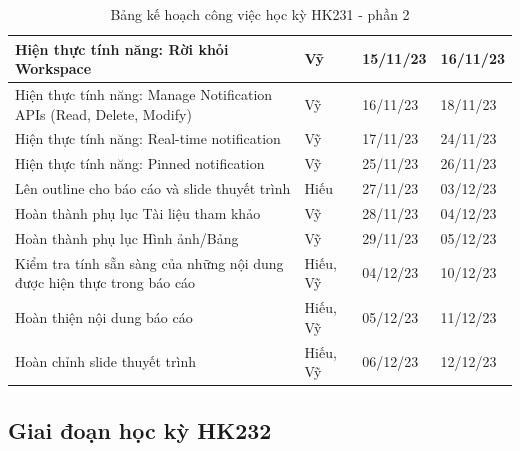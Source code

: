 \begin{table}[H]
{\begin{tabular}{|p{11cm}|p{1.75cm}|p{1.5cm}|p{1.5cm}|}
    Hiện thực tính năng: Rời khỏi Workspace                                 & Vỹ       & 15/11/23 & 16/11/23 \\ \hline
    Hiện thực tính năng: Manage Notification APIs (Read, Delete, Modify)    & Vỹ       & 16/11/23 & 18/11/23 \\ \hline
    Hiện thực tính năng: Real-time notification                             & Vỹ       & 17/11/23 & 24/11/23 \\ \hline
    Hiện thực tính năng: Pinned notification                                & Vỹ       & 25/11/23 & 26/11/23 \\ \hline
    Lên outline cho báo cáo và slide thuyết trình                           & Hiếu     & 27/11/23 & 03/12/23 \\ \hline
    Hoàn thành phụ lục Tài liệu tham khảo                                   & Vỹ       & 28/11/23 & 04/12/23 \\ \hline
    Hoàn thành phụ lục Hình ảnh/Bảng                                        & Vỹ       & 29/11/23 & 05/12/23 \\ \hline
    Kiểm tra tính sẵn sàng của những nội dung được hiện thực trong báo cáo                & Hiếu, Vỹ & 04/12/23 & 10/12/23 \\ \hline
    Hoàn thiện nội dung báo cáo                                             & Hiếu, Vỹ & 05/12/23 & 11/12/23 \\ \hline
    Hoàn chỉnh slide thuyết trình                                           & Hiếu, Vỹ & 06/12/23 & 12/12/23 \\ \hline
    \end{tabular}%
    }
    \caption{Bảng kế hoạch công việc học kỳ HK231 - phần 2}
\end{table}

\subsection{Giai đoạn học kỳ HK232}

